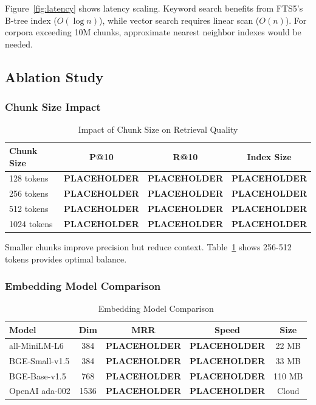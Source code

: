 \documentclass[conference]{IEEEtran}
\begin{document}
Figure~\ref{fig:latency} shows latency scaling. Keyword search benefits from FTS5's B-tree index ($O(\log n)$), while vector search requires linear scan ($O(n)$). For corpora exceeding 10M chunks, approximate nearest neighbor indexes would be needed.

\subsection{Ablation Study}
\label{sec:ablation}

\subsubsection{Chunk Size Impact}

\begin{table}[htbp]
\caption{Impact of Chunk Size on Retrieval Quality}
\begin{center}
\begin{tabular}{lccc}
\toprule
\textbf{Chunk Size} & \textbf{P@10} & \textbf{R@10} & \textbf{Index Size} \\
\midrule
128 tokens & \textbf{PLACEHOLDER} & \textbf{PLACEHOLDER} & \textbf{PLACEHOLDER} \\
256 tokens & \textbf{PLACEHOLDER} & \textbf{PLACEHOLDER} & \textbf{PLACEHOLDER} \\
512 tokens & \textbf{PLACEHOLDER} & \textbf{PLACEHOLDER} & \textbf{PLACEHOLDER} \\
1024 tokens & \textbf{PLACEHOLDER} & \textbf{PLACEHOLDER} & \textbf{PLACEHOLDER} \\
\bottomrule
\end{tabular}
\label{tab:chunksize}
\end{center}
\end{table}

Smaller chunks improve precision but reduce context. Table~\ref{tab:chunksize} shows 256-512 tokens provides optimal balance.

\subsubsection{Embedding Model Comparison}

\begin{table}[htbp]
\caption{Embedding Model Comparison}
\begin{center}
\begin{tabular}{lcccc}
\toprule
\textbf{Model} & \textbf{Dim} & \textbf{MRR} & \textbf{Speed} & \textbf{Size} \\
\midrule
all-MiniLM-L6 & 384 & \textbf{PLACEHOLDER} & \textbf{PLACEHOLDER} & 22 MB \\
BGE-Small-v1.5 & 384 & \textbf{PLACEHOLDER} & \textbf{PLACEHOLDER} & 33 MB \\
BGE-Base-v1.5 & 768 & \textbf{PLACEHOLDER} & \textbf{PLACEHOLDER} & 110 MB \\
OpenAI ada-002 & 1536 & \textbf{PLACEHOLDER} & \textbf{PLACEHOLDER} & Cloud \\
\bottomrule
\end{tabular}
\label{tab:embeddings}
\end{center}
\end{table}
\end{document}
